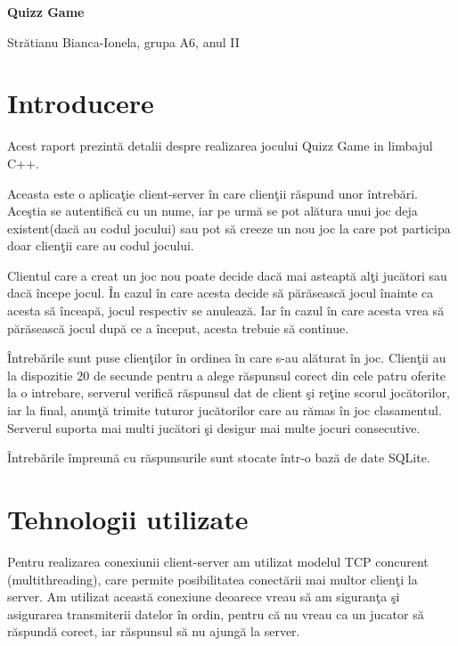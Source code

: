 \documentclass[11pt,leqno, runningheads]{llncs}
\begin{document}
\centerline{\bf \Large Quizz Game }

\vspace{0.5cm}

\centerline{{\large Str\u atianu Bianca-Ionela, grupa A6, anul II }}

\vspace{1cm}

\section{Introducere}
\hspace{1 cm} Acest raport prezint\u a detalii despre realizarea jocului Quizz Game in limbajul C++.

Aceasta este o aplica\c tie client-server \^{i}n care clien\c tii r\u aspund unor \^{i}ntreb\u ari. Ace\c stia se autentific\u a cu un nume, iar pe urm\u a se pot al\u atura unui joc deja existent(dac\u a au codul jocului) sau pot s\u a creeze un nou joc la care pot participa doar clien\c tii care au codul jocului.

Clientul care a creat un joc nou poate decide dac\u a mai asteapt\u a al\c ti juc\u atori sau dac\u a \^{i}ncepe jocul. \^{I}n cazul \^{i}n care acesta decide s\u a p\u ar\u aseasc\u a jocul \^{i}nainte ca acesta s\u a \^{i}nceap\u a, jocul respectiv se anuleaz\u a. Iar \^{i}n cazul \^{i}n care acesta vrea s\u a p\u ar\u aseasc\u a jocul dup\u a ce a \^{i}nceput, acesta trebuie s\u a continue.  

\^{I}ntreb\u arile sunt puse clien\c tilor \^{i}n ordinea \^{i}n care s-au al\u aturat \^{i}n joc. Clien\c tii au la dispozitie 20 de secunde pentru a alege r\u aspunsul corect din cele patru oferite la o intrebare, serverul verific\u a r\u aspunsul dat de client \c si re\c tine scorul joc\u atorilor, iar la final, anun\c t\u a trimite tuturor juc\u atorilor care au r\u amas \^{i}n joc clasamentul. Serverul suporta mai multi juc\u atori \c si desigur mai multe jocuri consecutive. 

\^{I}ntreb\u arile \^{i}mpreun\u a cu r\u aspunsurile sunt stocate \^{i}ntr-o baz\u a de date SQLite. 

\vspace{1cm}

\section{Tehnologii utilizate}

\hspace{1 cm}Pentru realizarea conexiunii client-server am utilizat modelul TCP\cite{1} concurent (multithreading), care permite posibilitatea conect\u arii mai multor clien\c ti la server. Am utilizat aceast\u a conexiune deoarece vreau s\u a am siguran\c ta \c si asigurarea transmiterii datelor \^{i}n ordin, pentru c\u a nu vreau ca un jucator s\u a r\u aspund\u a corect, iar r\u aspunsul s\u a nu ajung\u a la server.
\end{document}
